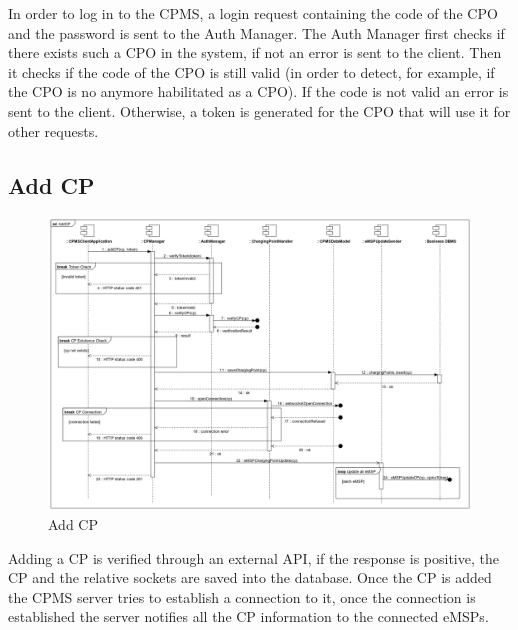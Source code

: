 \documentclass{Configuration_Files/PoliMi3i_thesis}
\begin{document}
In order to log in to the CPMS, a login request containing the code of the CPO and the password is sent to the Auth Manager. The Auth Manager first checks if there exists such a CPO in the system, if not an error is sent to the client. Then it checks if the code of the CPO is still valid (in order to detect, for example, if the CPO is no anymore habilitated as a CPO). If the code is not valid an error is sent to the client. Otherwise, a token is generated for the CPO that will use it for other requests.

\subsection{Add CP}
\begin{figure}[H]
    \centering
    \includegraphics[width=1\textwidth]{Images/sequenceDiagrams/AddCP.jpg}
    \caption{Add CP}
\end{figure}
Adding a CP is verified through an external API, if the response is positive, the CP and the relative sockets are saved into the database. Once the CP is added the CPMS server tries to establish a connection to it, once the connection is established the server notifies all the CP information to the connected eMSPs.
\end{document}
